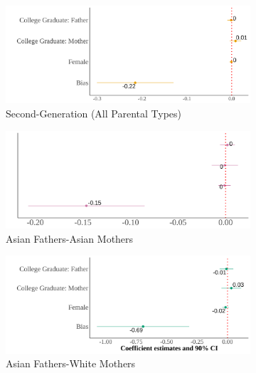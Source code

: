 \begin{center}
\begin{figure}[!htb]
\centering
\caption{Relationship Between Self-Reported Asian Identity and Bias: By Parental Types at the County Level}
\label{plot01-regression-byparent-county}
\begin{subfigure}{.48\textwidth}
\caption{Second-Generation (All Parental Types)}
\centering
\includegraphics[width=.9\linewidth]{county-by-parents-regs-all.png}
\end{subfigure}
\centering
\begin{subfigure}{.48\textwidth}
\caption{Asian Fathers-Asian Mothers}
\centering
\includegraphics[width=.9\linewidth]{county-by-parents-regs-hh.png}
\end{subfigure}
\begin{subfigure}{.48\textwidth}
\caption{Asian Fathers-White Mothers}
\centering
\includegraphics[width=.9\linewidth]{county-by-parents-regs-hw.png}
\end{subfigure}
\begin{subfigure}{.48\textwidth}

\end{subfigure}
\end{figure}
\end{center}
